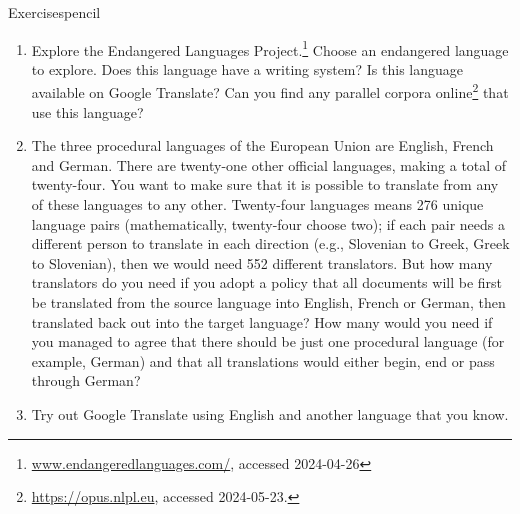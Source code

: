 \begin{tblsfilledsymbol}{Exercises}{pencil}
\begin{enumerate}
\item   Explore the Endangered Languages Project.\footnote{\url{www.endangeredlanguages.com/}, accessed 2024-04-26} Choose an endangered language to explore.   Does this language have a writing system? Is this language available on Google Translate?  Can you find any parallel corpora online\footnote{\url{https://opus.nlpl.eu}, accessed 2024-05-23.} that use this language?  

	\item The three procedural languages of the European Union are English, French and German. There are twenty-one other official languages, making 
a total of twenty-four.
	You want to make sure that it is possible to translate from any of these languages to any other. Twenty-four languages means 276 unique language pairs (mathematically, twenty-four choose two); if each pair needs a different person to translate in each direction (e.g., Slovenian to Greek, Greek to Slovenian), then we would need 552 different translators. But how many translators  do you need if you adopt a policy that all documents will be first be translated 
	from the source language into English, French or German, then translated back out into the target language? How many would you need if you managed to agree that there should be just one procedural language (for example, German) and that all translations would either begin, end or pass through German? 
	



	\item Try out Google Translate using English and another language that you know.
	 \begin{enumerate}


\end{enumerate}
\end{enumerate}
\end{tblsfilledsymbol}
